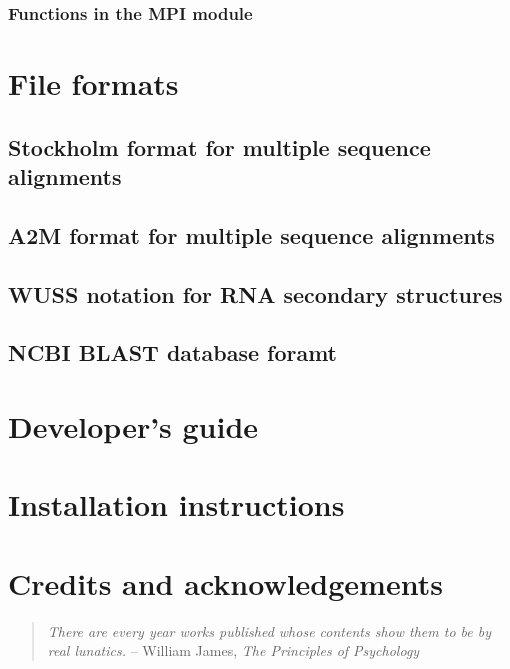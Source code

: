 \documentclass[10pt]{book}
\begin{document}
\subsection{Functions in the MPI module}




\newpage
\chapter{File formats}

\section{Stockholm format for multiple sequence alignments}


\section{A2M format for multiple sequence alignments}



\newpage
\section{WUSS notation for RNA secondary structures}



\newpage
\section{NCBI BLAST database foramt}



\newpage
\chapter{Developer's guide}


\newpage
\chapter{Installation instructions}


\newpage
\chapter{Credits and acknowledgements}
\begin{quote}
\emph{There are every year works published whose contents show them to
  be by real lunatics.}
\hspace*{1em}\hfill -- William James, \emph{The Principles of Psychology}
\end{quote}

\newpage
\newcommand{\bibfont}{\footnotesize}


\end{document}
